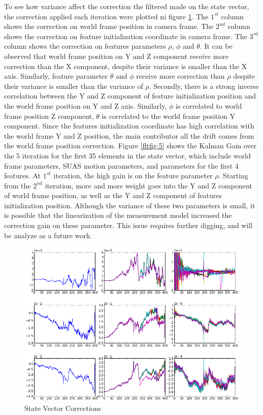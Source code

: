 To see how variance affect the correction the filtered made on the
state vector, the correction applied each iteration were plotted ni
figure \ref{fltfig:4}. The $1^{st}$ column shows the correction on
world frame position in camera frame. The $2^{nd}$ column shows the
correction on feature initialization coordinate in camera frame. The
$3^{rd}$ column shows the correction on features parameters $\rho$,
$\phi$ and $\theta$. It can be observed that world frame position on Y
and Z component receive more correction than the X component, despite
their variance is smaller than the X axis. Similarly, feature
parameter $\theta$ and $\phi$ receive more correction than $\rho$
despite their variance is smaller than the variance of $\rho$.
Secondly, there is a strong inverse correlation between the Y and Z
component of feature initialization position and the world frame
position on Y and Z axis. Similarly, $\phi$ is correlated to world
frame position Z component, $\theta$ is correlated to the world frame
position Y component. Since the features initialization coordinate has
high correlation with the world frame Y and Z position, the main
contributor all the drift comes from the world frame position
correction. Figure \ref{fltfig:5} shows the Kalman Gain over the 5
iteration for the first 35 elements in the state vector, which include
world frame parameters, SUAS motion parameters, and parameters for the
first 4 features. At $1^{st}$ iteration, the high gain is on the
feature parameter $\rho$. Starting from the $2^{nd}$ iteration, more
and more weight goes into the Y and Z component of world frame
position, as well as the Y and Z component of features initialization
position. Although the variance of these two parameters is small, it
is possible that the linearization of the measurement model increased
the correction gain on these parameter. This issue requires further
digging, and will be analyze as a future work.  

\begin{figure}[h]
\centering
\includegraphics[width=12cm, keepaspectratio=true]
{./Figures/fltfig/cut1/Figure112.png}
\caption{State Vector Corrections}
\label{fltfig:4}
\end{figure}

